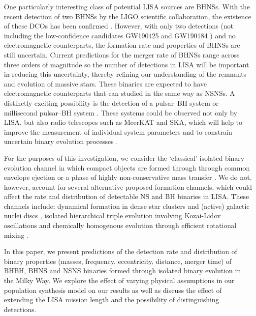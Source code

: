 One particularly interesting class of potential LISA sources are BHNSs. With the recent detection of two BHNSs by the LIGO scientific collaboration, the existence of these DCOs has been confirmed \citep{TheLIGOScientificCollaboration+2021}. However, with only two detections (not including the low-confidence candidates GW190425 and GW190184 \citep{Abbott+2020_GW190425,Abbott+2020_GW190814}) and no electromagnetic counterparts, the formation rate and properties of BHNSs are still uncertain. Current predictions for the merger rate of BHNSs range across three orders of magnitude \citep[e.g.][]{Abadie+2010, Broekgaarden+2021} so the number of detections in LISA will be important in reducing this uncertainty, thereby refining our understanding of the remnants and evolution of massive stars. These binaries are expected to have electromagnetic counterparts that can studied in the same way as NSNSs. A distinctly exciting possibility is the detection of a pulsar--BH system or millisecond pulsar--BH system \citep{Narayan+1991}. These systems could be observed not only by LISA, but also radio telescopes such as MeerKAT and SKA, which will help to improve the measurement of individual system parameters and to constrain uncertain binary evolution processes \citep[e.g.][]{Pfahl+2005,Chattopadhyay+2020}.

For the purposes of this investigation, we consider the `classical' isolated binary evolution channel \citep[e.g.][]{Tutukov+1973,Tutukov+1993,Smarr+1976,Srinivasan+1989,Kalogera+2007,Belczynski+2016} in which compact objects are formed through through common envelope ejection or a phase of highly non-conservative mass transfer \citep{Heuvel+2011, vandenHeuvel+2017}. We do not, however, account for several alternative proposed formation channels, which could affect the rate and distribution of detectable NS and BH binaries in LISA. These channels include: dynamical formation in dense star clusters \citep[e.g.][]{Sigurdsson+1993,PortegiesZwart+2000,Miller+2009,Rodriguez+2015} and (active) galactic nuclei discs \citep[e.g.][]{Morris+1993, Antonini+2016, McKernan+2020}, isolated hierarchical triple evolution involving Kozai-Lidov oscillations \citep[e.g.][]{Stephan+2016, Silsbee+2017,Antonini+2017, Toonen+2020} and chemically homogenous evolution through efficient rotational mixing \citep[e.g.][]{deMink+2009, deMink+2016,Marchant+2016,duBuisson+2020}.

In this paper, we present predictions of the detection rate and distribution of binary properties (masses, frequency, eccentricity, distance, merger time) of BHBH, BHNS and NSNS binaries formed through isolated binary evolution in the Milky Way. We explore the effect of varying physical assumptions in our population synthesis model on our results as well as discuss the effect of extending the LISA mission length and the possibility of distinguishing detections.

